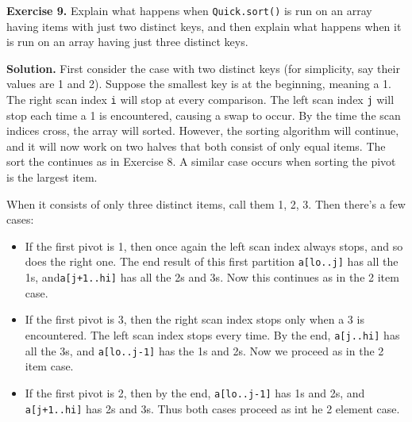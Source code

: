 \documentclass[12pt, a4paper]{article}
\newenvironment{ex}[2][Exercise]
{\par\medskip\noindent \textbf{#1 #2.}}
{\medskip}
\newenvironment{sol}[1][Solution]
{\par\medskip\noindent \textbf{#1.} }
{\medskip}
\begin{document}
	\begin{ex}{9}
		Explain what happens when \texttt{Quick.sort()} is run on an array having items
		with just two distinct keys, and then explain what happens when it is run on an
		array having just three distinct keys.
	\end{ex}
	\begin{sol}
		First consider the case with two distinct keys (for simplicity, say their values
		are 1 and 2). Suppose the smallest key is at the beginning, meaning a 1. The right
		scan index \texttt{i} will stop at every comparison. The left scan index \texttt{j}
		will stop each time a 1 is encountered, causing a swap to occur. By the time the 
		scan indices cross, the array will sorted. However, the sorting algorithm will
		continue, and it will now work on two halves that both consist of only equal
		items. The sort the continues as in Exercise 8. A similar case occurs when
		sorting the pivot is the largest item.
		
		When it consists of only three distinct items, call them 1, 2, 3. Then
		there's a few cases:
		\begin{itemize}
			\item If the first pivot is 1, then once again the left scan index always stops,
			and so does the right one. The end result of this first partition
			\texttt{a[lo..j]} has all the 1s, and\texttt{a[j+1..hi]} has all the 2s
			and 3s. Now this continues as in the 2 item case.
			\item If the first pivot is 3, then the right scan index stops only
			when a 3 is encountered. The left scan index stops every time. By
			the end, \texttt{a[j..hi]} has all the 3s,  and \texttt{a[lo..j-1]}
			has the 1s and 2s. Now we proceed as in the 2 item case.
			\item If the first pivot is 2, then by the end, \texttt{a[lo..j-1]}
			has 1s and 2s, and \texttt{a[j+1..hi]} has 2s and 3s. Thus both cases
			proceed as int he 2 element case.
		\end{itemize}
	\end{sol}
	\pagebreak
	\printbibliography
\end{document}

